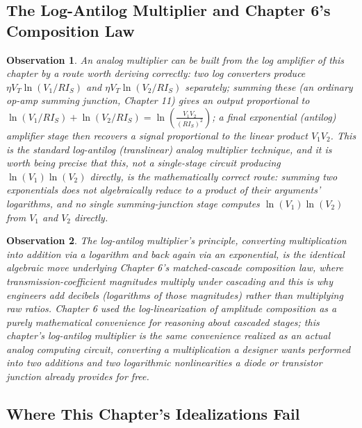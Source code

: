 \documentclass[12pt]{article}
\newtheorem{observation}{Observation}
\begin{document}
\subsection{The Log-Antilog Multiplier and Chapter 6's Composition Law}

\begin{observation}
An analog multiplier can be built from the log amplifier of this chapter by a route worth deriving correctly: two log converters produce $\eta V_T\ln(V_1/RI_S)$ and $\eta V_T\ln(V_2/RI_S)$ separately; summing these (an ordinary op-amp summing junction, Chapter 11) gives an output proportional to $\ln(V_1/RI_S) + \ln(V_2/RI_S) = \ln\!\left(\frac{V_1V_2}{(RI_S)^2}\right)$; a final exponential (antilog) amplifier stage then recovers a signal proportional to the linear product $V_1V_2$. This is the standard log-antilog (translinear) analog multiplier technique, and it is worth being precise that this, not a single-stage circuit producing $\ln(V_1)\ln(V_2)$ directly, is the mathematically correct route: summing two exponentials does not algebraically reduce to a product of their arguments' logarithms, and no single summing-junction stage computes $\ln(V_1)\ln(V_2)$ from $V_1$ and $V_2$ directly.
\end{observation}

\begin{observation}
The log-antilog multiplier's principle, converting multiplication into addition via a logarithm and back again via an exponential, is the identical algebraic move underlying Chapter 6's matched-cascade composition law, where transmission-coefficient magnitudes multiply under cascading and this is why engineers add decibels (logarithms of those magnitudes) rather than multiplying raw ratios. Chapter 6 used the log-linearization of amplitude composition as a purely mathematical convenience for reasoning about cascaded stages; this chapter's log-antilog multiplier is the same convenience realized as an actual analog computing circuit, converting a multiplication a designer wants performed into two additions and two logarithmic nonlinearities a diode or transistor junction already provides for free.
\end{observation}

\subsection{Where This Chapter's Idealizations Fail}
\end{document}
